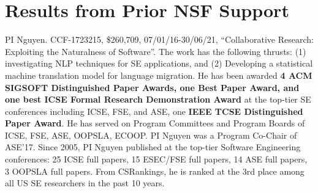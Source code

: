 \section{Results from Prior NSF Support}
\label{prior}

PI Nguyen. CCF-1723215, \$260,709, 07/01/16-30/06/21, ``Collaborative
Research: Exploiting the Naturalness of Software''.
%
 The work has the following
thrusts: (1) investigating NLP techniques for SE
applications, and (2) Developing a statistical machine translation
model for language migration.
%
%
He has been awarded {\bf 4 ACM SIGSOFT Distinguished Paper Awards, one
  Best Paper Award, and one best ICSE Formal Research Demonstration
  Award} at the top-tier SE conferences including ICSE, FSE, and ASE,
one {\bf IEEE TCSE Distinguished Paper Award}. He has served on
Program Committees and Program Boards of ICSE, FSE, ASE, OOPSLA,
ECOOP. PI Nguyen was a Program Co-Chair of ASE'17. Since 2005, PI
Nguyen published at the top-tier Software Engineering conferences: 25
ICSE full papers, 15 ESEC/FSE full papers, 14 ASE full papers, 3
OOPSLA full papers.
From CSRankings, he is ranked at the 3rd place among all US SE researchers in the past 10 years.

